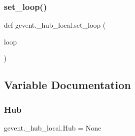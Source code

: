 \subsubsection{\texorpdfstring{set\+\_\+loop()}{set\_loop()}}
{\footnotesize\ttfamily def gevent.\+\_\+hub\+\_\+local.\+set\+\_\+loop (\begin{DoxyParamCaption}\item[{}]{loop }\end{DoxyParamCaption})}



\subsection{Variable Documentation}
\mbox{\label{namespacegevent_1_1__hub__local_a8a84f38e9c455d96fb40f319aa32e91c}} 
\subsubsection{\texorpdfstring{Hub}{Hub}}
{\footnotesize\ttfamily gevent.\+\_\+hub\+\_\+local.\+Hub = None}

